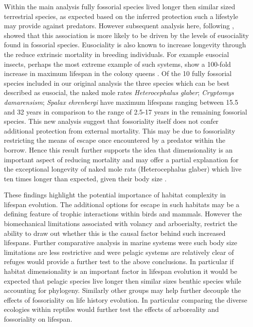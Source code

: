 Within the main analysis fully fossorial species lived longer then similar sized terrestrial species, as expected based on the inferred protection such a lifestyle may provide against predators. However subsequent analysis here, following \cite{williams2015ecology}, showed that this association is more likely to be driven by the levels of eusociality found in fossorial species. Eusociality is also known to increase longevity through the reduce extrinsic mortality in breeding individuals. For example eusocial insects, perhaps the most extreme example of such systems, show a 100-fold increase in maximum lifespan in the colony queens \citep{keller1997extraordinary}. Of the 10 fully fossorial species included in our original analysis the three species which can be best described as eusocial, the naked mole rates \textit{Heterocephalus glaber}; \textit{Cryptomys damarensism}; \textit{Spalax ehrenbergi} have maximum lifespans ranging between 15.5 and 32 years in comparison to the range of 2.5-17 years in the remaining fossorial species. This new analysis suggest that fossoriality itself does not confer additional protection from external mortality. This may be due to fossoriality restricting the means of escape once encountered by a predator within the borrow. Hence this result further supports the idea that dimensionality is an important aspect of reducing mortality and may offer a partial explanation for the exceptional longevity of naked mole rats (Heterocephalus glaber) which live ten times longer than expected, given their body size \citep{buffenstein2002naked}.


These findings highlight the potential importance of habitat complexity in lifespan evolution. The additional options for escape in such habitats may be a defining feature of trophic interactions within birds and mammals. However the biomechanical limitations associated with volancy and arboerialty, restrict the ability to draw out whether this is the causal factor behind such increased lifespans. Further comparative analysis in marine systems were such body size limitations are less restrictive and were pelagic systems are relatively clear of refuges would provide a further test to the above conclusions. In particular if habitat dimensionality is an important factor in lifespan evolution it would be expected that pelagic species live longer then similar sizes benthic species while accounting for phylogeny. Similarly other groups may help further decouple the effects of fossoriality on life history evolution. In particular comparing the diverse ecologies within reptiles would further test the effects of arboreality and fossoriality on lifespan.

